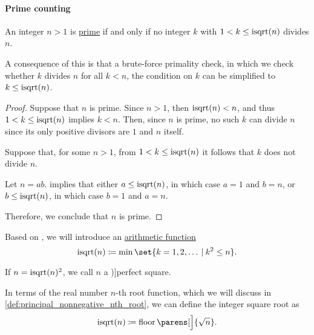 \paragraph{Prime counting}

\begin{proposition}\label{thm:prime_number_sqrt}
  An integer \( n > 1 \) is \hyperref[def:prime_number]{prime} if and only if no integer \( k \) with \( 1 < k \leq \op{isqrt}(n) \) divides \( n \).
\end{proposition}
\begin{comments}
  \item A consequence of this is that a brute-force primality check, in which we check whether \( k \) divides \( n \) for all \( k < n \), the condition on \( k \) can be simplified to \( k \leq \op{isqrt}(n) \).
\end{comments}
\begin{proof}
  \SufficiencySubProof Suppose that \( n \) is prime. Since \( n > 1 \), then \( \op{isqrt}(n) < n \), and thus \( 1 < k \leq \op{isqrt}(n) \) implies \( k < n \). Then, since \( n \) is prime, no such \( k \) can divide \( n \) since its only positive divisors are \( 1 \) and \( n \) itself.

  \NecessitySubProof Suppose that, for some \( n > 1 \), from \( 1 < k \leq \op{isqrt}(n) \) it follows that \( k \) does not divide \( n \).

  Let \( n = ab \).  implies that either \( a \leq \op{isqrt}(n) \), in which case \( a = 1 \) and \( b = n \), or \( b \leq \op{isqrt}(n) \), in which case \( b = 1 \) and \( a = n \).

  Therefore, we conclude that \( n \) is prime.
\end{proof}

\begin{definition}\label{def:int_sqrt}\mimprovised
  Based on \cite{PythonDocs:3.13:math}, we will introduce an  \hyperref[def:arithmetic_function]{arithmetic function}
  \begin{equation*}
    \op{isqrt}(n) \coloneqq \min\set{ k = 1, 2, \ldots \given k^2 \leq n }.
  \end{equation*}

  If \( n = \op{isqrt}(n)^2 \), we call \( n \) a \term[en=perfect square (\cite[example 1.7.1]{Rosen2019DiscreteMathematics})]{perfect square}.
\end{definition}
\begin{comments}
  \item In terms of the real number \( n \)-th root function, which we will discuss in \cref{def:principal_nonnegative_nth_root}, we can define the integer square root as
  \begin{equation*}
    \op{isqrt}(n) \coloneqq \floor\parens[\Big]{ \sqrt{n} }.
  \end{equation*}
\end{comments}

